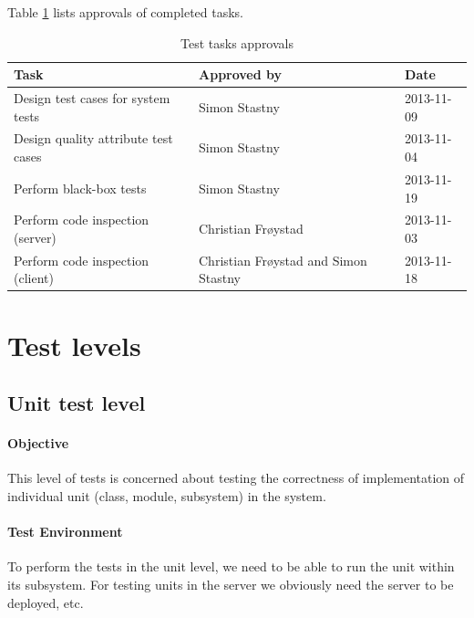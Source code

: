\documentclass[11pt]{book}
\begin{document}
Table \ref{tab:test_plan_approvals} lists approvals of completed tasks.

\begin{table}[H]
    \centering
    \begin{tabular}{| l | l | l |}
        \hline
        Task                                & Approved by                           & Date           \\ \hline
        Design test cases for system tests  & Simon Stastny                         & 2013-11-09     \\ \hline
        Design quality attribute test cases & Simon Stastny                         & 2013-11-04     \\ \hline
        Perform black-box tests             & Simon Stastny                         & 2013-11-19     \\ \hline
        Perform code inspection (server)    & Christian Frøystad                    & 2013-11-03     \\ \hline
        Perform code inspection (client)    & Christian Frøystad and Simon Stastny  & 2013-11-18     \\ \hline
    \end{tabular}
    \caption{Test tasks approvals}
    \label{tab:test_plan_approvals}
\end{table}

\section{Test levels}\label{sec:testlevels}

\subsection{Unit test level}

\paragraph{Objective}
This level of tests is concerned about testing the correctness of implementation of individual unit (class, module, subsystem) in the system.

\paragraph{Test Environment}
To perform the tests in the unit level, we need to be able to run the unit within its subsystem. For testing units in the server we obviously need the server to be deployed, etc.
\end{document}
